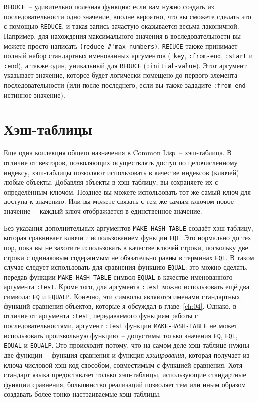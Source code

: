 \lstinline{REDUCE}~-- удивительно полезная функция: если вам нужно создать из
последовательности одно значение, вполне вероятно, что вы сможете сделать это с помощью
\lstinline{REDUCE}, и такая запись зачастую оказывается весьма лаконичной.
Например, для нахождения максимального значения в последовательности вы можете просто
написать \lstinline!(reduce #'max numbers)!. \lstinline{REDUCE} также принимает полный набор
стандартных именованных аргументов (\lstinline{:key}, \lstinline{:from-end}, \lstinline{:start} и
\lstinline{:end}), а также один, уникальный для \lstinline{REDUCE} (\lstinline{:initial-value}).  Этот
аргумент указывает значение, которое будет логически помещено до первого элемента
последовательности (или после последнего, если вы также зададите \lstinline{:from-end} истинное
значение).

\section{Хэш-таблицы}

Еще одна коллекция общего назначения в Common Lisp~-- хэш-таблица.  В отличие от векторов,
позволяющих осуществлять доступ по целочисленному индексу,
хэш-таблицы позволяют использовать в качестве индексов (ключей) любые объекты.
Добавляя объекты в хэш-таблицу, вы сохраняете их с определённым ключом.  Позднее вы
можете использовать тот же самый ключ для доступа к значению.  Или вы можете связать
с тем же самым ключом новое значение~-- каждый ключ отображается в единственное значение.

Без указания дополнительных аргументов \lstinline{MAKE-HASH-TABLE} создаёт хэш-таблицу, которая
сравнивает ключи с использованием функции \lstinline{EQL}.  Это нормально до тех пор, пока вы
не захотите использовать в качестве ключей строки, поскольку две строки с одинаковым
содержимым не обязательно равны в терминах \lstinline{EQL}.  В таком случае следует
использовать для сравнения функцию \lstinline{EQUAL}: это можно сделать, передав функции
\lstinline{MAKE-HASH-TABLE} символ \lstinline{EQUAL} в качестве именованного аргумента \lstinline{:test}.
Кроме того, для аргумента \lstinline{:test} можно использовать ещё два символа: \lstinline{EQ} и
\lstinline{EQUALP}.  Конечно, эти символы являются именами стандартных функций сравнения
объектов, которые я обсуждал в главе~\ref{ch:04}.  Однако, в отличие от аргумента \lstinline{:test},
передаваемого функциям работы с последовательностями, аргумент \lstinline{:test} функции
\lstinline{MAKE-HASH-TABLE} не может использовать произвольную функцию~-- допустимы только
значения \lstinline{EQ}, \lstinline{EQL}, \lstinline{EQUAL} и \lstinline{EQUALP}.  Это происходит потому, что
на самом деле хэш-таблице нужны две функции~-- функция сравнения и функция
\textit{хэширования}, которая получает из ключа числовой хэш-код способом, совместимым с
функцией сравнения.  Хотя стандарт языка предоставляет
только хэш-таблицы, использующие стандартные функции сравнения, большинство
реализаций позволяет тем или иным образом создавать более тонко настраиваемые
хэш-таблицы.

